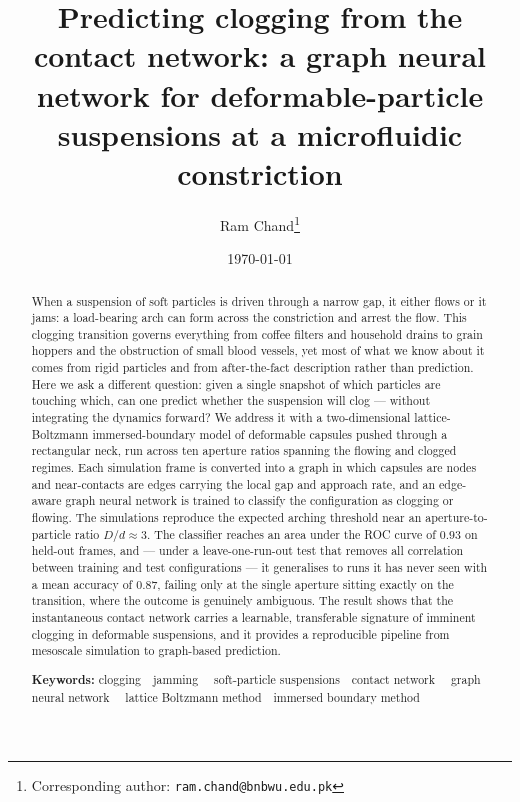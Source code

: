 \documentclass[11pt,a4paper]{article}
\title{\textbf{Predicting clogging from the contact network:
a graph neural network for deformable-particle suspensions
at a microfluidic constriction}}
\author[1]{Ram Chand\thanks{Corresponding author:
   \texttt{ram.chand@bnbwu.edu.pk}}}
\affil[1]{Department of Natural Sciences,
   The Begum Nusrat Bhutto Women University, Sukkur, Sindh, Pakistan}
\date{\today}
\begin{document}
\maketitle

\begin{abstract}
\noindent When a suspension of soft particles is driven through a
narrow gap, it either flows or it jams: a load-bearing arch can form
across the constriction and arrest the flow. This clogging transition
governs everything from coffee filters and household drains to grain
hoppers and the obstruction of small blood vessels, yet most of what we
know about it comes from rigid particles and from after-the-fact
description rather than prediction. Here we ask a different question:
given a single snapshot of which particles are touching which, can one
predict whether the suspension will clog --- without integrating the
dynamics forward? We address it with a two-dimensional
lattice-Boltzmann immersed-boundary model of deformable capsules pushed
through a rectangular neck, run across ten aperture ratios spanning the
flowing and clogged regimes. Each simulation frame is converted into a
graph in which capsules are nodes and near-contacts are edges carrying
the local gap and approach rate, and an edge-aware graph neural network
is trained to classify the configuration as clogging or flowing. The
simulations reproduce the expected arching threshold near an
aperture-to-particle ratio $D/d\approx 3$. The classifier reaches an
area under the ROC curve of $0.93$ on held-out frames, and --- under a
leave-one-run-out test that removes all correlation between training
and test configurations --- it generalises to runs it has never seen
with a mean accuracy of $0.87$, failing only at the single aperture
sitting exactly on the transition, where the outcome is genuinely
ambiguous. The result shows that the instantaneous contact network
carries a learnable, transferable signature of imminent clogging in
deformable suspensions, and it provides a reproducible pipeline from
mesoscale simulation to graph-based prediction.

\vspace{1em}
\noindent\textbf{Keywords:}
clogging~\textperiodcentered~jamming~\textperiodcentered~
soft-particle suspensions~\textperiodcentered~contact network~
\textperiodcentered~graph neural network~\textperiodcentered~
lattice Boltzmann method~\textperiodcentered~immersed boundary method
\end{abstract}
\end{document}
